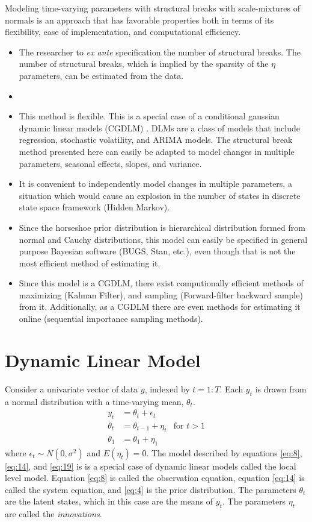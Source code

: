 \documentclass{article}
\begin{document}
Modeling time-varying parameters with structural breaks with scale-mixtures of normals is an approach that has favorable properties both in terms of its flexibility, ease of implementation, and computational efficiency.
\begin{itemize}
\item The researcher to \textit{ex ante} specification the number of structural breaks. 
  The number of structural breaks, which is implied by the sparsity of the $\eta$ parameters, can be estimated from the data.
\item 
\item This method is flexible.
  This is a special case of a conditional gaussian dynamic linear models (CGDLM) \parencites{WestHarrison1997}{DurbinKoopman2012}{CommandeurKoopman2007}{ShumwayStoffer2010}.
  DLMs are a class of models that include regression, stochastic volatility, and ARIMA models.
  The structural break method presented here can easily be adapted to model changes in multiple parameters, seasonal effects, slopes, and variance.
\item It is convenient to independently model changes in multiple parameters, a situation which would cause an explosion in the number of states in discrete state space framework (Hidden Markov).
\item Since the horseshoe prior distribution is hierarchical distribution formed from normal and Cauchy distributions, this model can easily be specified in general purpose Bayesian software (BUGS, Stan, etc.), even though that is not the most efficient method of estimating it.
\item Since this model is a CGDLM, there exist computionally  efficient methods of maximizing (Kalman Filter), and sampling (Forward-filter backward sample) from it.
  Additionally, as a CGDLM there are even methods for estimating it online (sequential importance sampling methods).
\end{itemize}

\section{Dynamic Linear Model}

Consider a univariate vector of data $y$, indexed by $t = 1:T$.
Each $y_{t}$ is drawn from a normal distribution with a time-varying mean, $\theta_{t}$.
\begin{align}
  \label{eq:8}
  y_t &= \theta_t + \epsilon_t \\
  \label{eq:14}
  \theta_t &= \theta_{t-1} + \eta_{t} & \text{for $t > 1$} \\
  \label{eq:19}
  \theta_1 &= \theta_{1} + \eta_{1}
\end{align}
where $\epsilon_{t} \sim N(0, \sigma^{2})$ and $E(\eta_{t}) = 0$.
The model described by equations \eqref{eq:8}, \eqref{eq:14}, and \eqref{eq:19} is 
is a special case of dynamic linear models called the local level model.
Equation \eqref{eq:8} is called the observation equation, 
equation \eqref{eq:14} is called the system equation,
and \eqref{eq:4} is the prior distribution.
The parameters $\theta_{t}$ are the latent states, which in this case are the means of $y_{t}$.
The parameters $\eta_{t}$ are called the \textit{innovations}.
\end{document}
